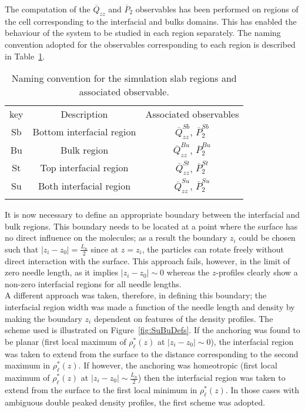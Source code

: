 The computation of the $\overline{Q}_{zz}$ and $\overline{P}_2$ observables has been 
performed on regions of the cell corresponding to the interfacial and bulks domains. 
This has enabled the behaviour of the system to be studied in each region separately. 
The naming convention adopted for the observables
corresponding to each region is described in Table~\ref{tble:SuBuNamingCvention}.\\

\begin{table}[h]
\centering
\begin{tabular}{||c||c||c||}
\hhline{|t:=:t:=:t:=:t|}
key	&Description			&Associated observables		\\
\hhline{|:=::=::=:|}
Sb	&Bottom interfacial region	&$\overline{Q}^{Sb}_{zz}$, $\overline{P}^{Sb}_2$\\
Bu	&Bulk region			&$\overline{Q}^{Bu}_{zz}$, $\overline{P}^{Bu}_2$\\
St	&Top interfacial region		&$\overline{Q}^{St}_{zz}$, $\overline{P}^{St}_2$\\
Su	&Both interfacial region	&$\overline{Q}^{Su}_{zz}$, $\overline{P}^{Su}_2$\\
\hhline{|b:=:b:=:b:=:b|}
\end{tabular}
\caption{Naming convention for the simulation slab regions and associated observable.}
\label{tble:SuBuNamingCvention}
\end{table}

It is now necessary to define an 
appropriate boundary between the interfacial and bulk regions. 
This boundary needs to be located at a point where the surface has no direct influence on
the molecules; as a result the boundary $z_i$ could be chosen such that $|z_i-z_0| = \frac{L_n}{2}$
since at $z=z_i$, the particles can rotate  freely without direct interaction  with the surface. 
This approach fails, however, in the limit of zero needle length, as
it implies $|z_i-z_0| \sim 0$ whereas the $z$-profiles clearly show a non-zero interfacial
regions for all needle lengths.\\
A different approach was taken, therefore, in defining this boundary; the interfacial region
width was made a function of the needle length and density by making the boundary $z_i$ 
dependent on features of the density profiles.
The scheme used is illustrated on Figure~\ref{fig:SuBuDefs}. If the anchoring was found
to be planar (first local maximum of $\rho^{*}_\ell(z)$ at $|z_i-z_0|\sim 0$), 
the interfacial region  was taken to extend from  the surface to the distance corresponding 
to the second maximum in  $\rho^{*}_\ell(z)$. If however, the anchoring was homeotropic 
(first local maximum of $\rho^{*}_\ell(z)$ at $|z_i-z_0|\sim \frac{L_n}{2}$) then the 
interfacial region was taken to extend from
the surface to the first local minimum in $\rho^{*}_\ell(z)$. In those cases with ambiguous 
double peaked density profiles, the first scheme was adopted.

